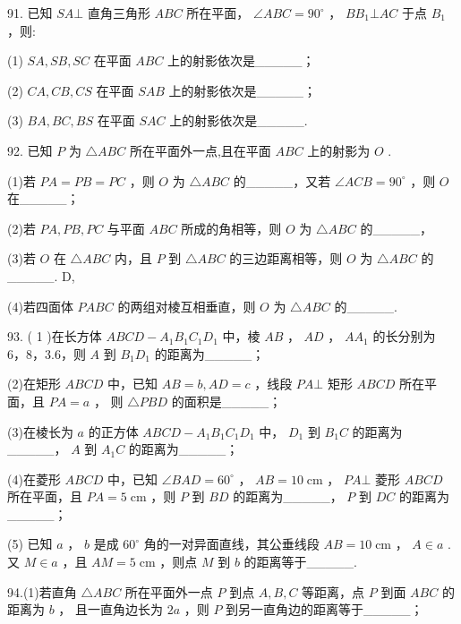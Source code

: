 \documentclass[10pt]{article}
\begin{document}
91. 已知 \({SA} \bot\) 直角三角形 \({ABC}\) 所在平面， \(\angle {ABC} = {90}^{ \circ  }\) ， \(B{B}_{1} \bot  {AC}\) 于点 \({B}_{1}\) ，则:

(1) \({SA},{SB},{SC}\) 在平面 \({ABC}\) 上的射影依次是\_\_\_\_\_；

(2) \({CA},{CB},{CS}\) 在平面 \({SAB}\) 上的射影依次是\_\_\_\_\_；

(3) \({BA},{BC},{BS}\) 在平面 \({SAC}\) 上的射影依次是\_\_\_\_\_.

92. 已知 \(P\) 为 \(\bigtriangleup {ABC}\) 所在平面外一点,且在平面 \({ABC}\) 上的射影为 \(O\) .

(1)若 \({PA} = {PB} = {PC}\) ，则 \(O\) 为 \(\bigtriangleup  {ABC}\) 的\_\_\_\_\_，又若 \(\angle {ACB} = {90}^{ \circ  }\) ，则 \(O\) 在\_\_\_\_\_；

(2)若 \({PA},{PB},{PC}\) 与平面 \({ABC}\) 所成的角相等，则 \(O\) 为 \(\bigtriangleup  {ABC}\) 的\_\_\_\_\_，

(3)若 \(O\) 在 \(\bigtriangleup  {ABC}\) 内，且 \(P\) 到 \(\bigtriangleup  {ABC}\) 的三边距离相等，则 \(O\) 为 \(\bigtriangleup  {ABC}\) 的\_\_\_\_\_. D,

(4)若四面体 \({PABC}\) 的两组对棱互相垂直，则 \(O\) 为 \(\bigtriangleup  {ABC}\) 的\_\_\_\_\_.

93. ( 1 )在长方体 \({ABCD} - {A}_{1}{B}_{1}{C}_{1}{D}_{1}\) 中，棱 \({AB}\) ， \({AD}\) ， \(A{A}_{1}\) 的长分别为 6，8，3.6，则 \(A\) 到 \({B}_{1}{D}_{1}\) 的距离为\_\_\_\_\_；

(2)在矩形 \({ABCD}\) 中，已知 \({AB} = b,{AD} = c\) ，线段 \({PA} \bot\) 矩形 \({ABCD}\) 所在平面，且 \({PA} = a\) ， 则 \(\bigtriangleup  {PBD}\) 的面积是\_\_\_\_\_；

(3)在棱长为 \(a\) 的正方体 \({ABCD} - {A}_{1}{B}_{1}{C}_{1}{D}_{1}\) 中， \({D}_{1}\) 到 \({B}_{1}C\) 的距离为\_\_\_\_\_， \(A\) 到 \({A}_{1}C\) 的距离为\_\_\_\_\_；

(4)在菱形 \({ABCD}\) 中，已知 \(\angle {BAD} = {60}^{ \circ  }\) ， \({AB} = {10}\mathrm{\;{cm}}\) ， \({PA}\bot\) 菱形 \({ABCD}\) 所在平面，且 \({PA} = 5\mathrm{\;{cm}}\) ，则 \(P\) 到 \({BD}\) 的距离为\_\_\_\_\_， \(P\) 到 \({DC}\) 的距离为\_\_\_\_\_；

(5) 已知 \(a\) ， \(b\) 是成 \({60}^{ \circ  }\) 角的一对异面直线，其公垂线段 \({AB} = {10}\mathrm{\;{cm}}\) ， \({A \in  a}\) . 又 \(M \in  a\) ，且 \({AM} = 5\mathrm{\;{cm}}\) ，则点 \(M\) 到 \(b\) 的距离等于\_\_\_\_\_.

94.(1)若直角 \(\bigtriangleup  {ABC}\) 所在平面外一点 \(P\) 到点 \(A,B,C\) 等距离，点 \(P\) 到面 \({ABC}\) 的距离为 \(b\) ， 且一直角边长为 \({2a}\) ，则 \(P\) 到另一直角边的距离等于\_\_\_\_\_；
\end{document}
